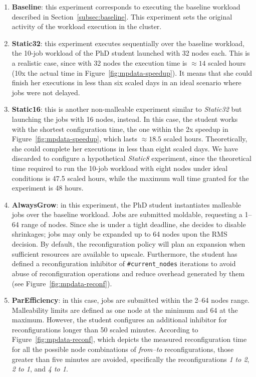 \documentclass[a4paper,fleqn]{cas-dc}
\begin{document}
\begin{enumerate}[wide]
    \item \textbf{Baseline}: this experiment corresponds to executing the baseline workload described in Section~\ref{subsec:baseline}. This experiment sets the original activity of the workload execution in the cluster.
    \item \textbf{Static32}: this experiment executes sequentially over the baseline workload, the 10-job workload of the PhD student launched with 32 nodes each.
    This is a realistic case, since with 32 nodes the execution time is $\approx14$ scaled hours (10x the actual time in Figure~\ref{fig:mpdata-speedup}). It means that she could finish her executions in less than six scaled days in an ideal scenario where jobs were not delayed.
    \item \textbf{Static16}: this is another non-malleable experiment similar to \textit{Static32} but launching the jobs with 16 nodes, instead.
    In this case, the student works with the shortest configuration time, the one within the 2x speedup in Figure~\ref{fig:mpdata-speedup}, which lasts $\approx18.5$ scaled hours.
    Theoretically, she could complete her executions in less than eight scaled days.
    We have discarded to configure a hypothetical \textit{Static8} experiment, since the theoretical time required to run the 10-job workload with eight nodes under ideal conditions is 47.5 scaled hours, while the maximum wall time granted for the experiment is 48 hours.
    \item \textbf{AlwaysGrow}: in this experiment, the PhD student instantiates malleable jobs over the baseline workload. Jobs are submitted moldable, requesting a 1--64 range of nodes. 
    Since she is under a tight deadline, she decides to disable shrinkages; jobs may only be expanded up to 64 nodes upon the RMS decision. By default, the reconfiguration policy will plan an expansion when sufficient resources are available to upscale.
    Furthermore, the student has defined a reconfiguration inhibitor of \texttt{\#current\_nodes} iterations to avoid abuse of reconfiguration operations and reduce overhead generated by them (see Figure~\ref{fig:mpdata-reconf}).
    \item \textbf{ParEfficiency}: in this case, jobs are submitted within the 2--64 nodes range.
    Malleability limits are defined as one node at the minimum and 64 at the maximum.
    However, the student configures an additional inhibitor for reconfigurations longer than 50 scaled minutes. 
    According to Figure~\ref{fig:mpdata-reconf}, which depicts the measured reconfiguration time for all the possible node combinations of \textit{from--to} reconfigurations, those greater than five minutes are avoided, specifically the reconfigurations \textit{1 to 2}, \textit{2 to 1}, and \textit{4 to 1}.

\end{enumerate}
\end{document}
